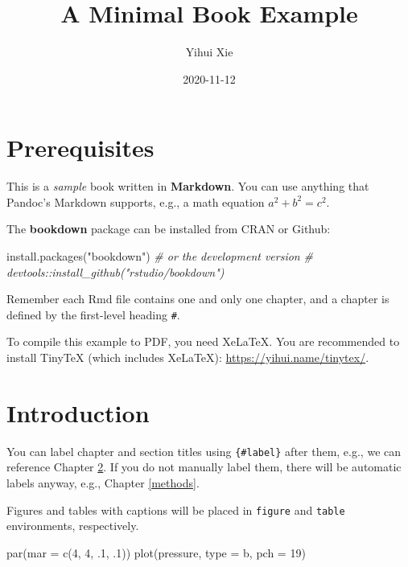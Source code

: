 \documentclass[
]{book}
\title{A Minimal Book Example}
\author{Yihui Xie}
\date{2020-11-12}
\newenvironment{Shaded}{\begin{snugshade}}{\end{snugshade}}
\newcommand{\AttributeTok}[1]{\textcolor[rgb]{0.77,0.63,0.00}{#1}}
\newcommand{\CommentTok}[1]{\textcolor[rgb]{0.56,0.35,0.01}{\textit{#1}}}
\newcommand{\DecValTok}[1]{\textcolor[rgb]{0.00,0.00,0.81}{#1}}
\newcommand{\FunctionTok}[1]{\textcolor[rgb]{0.00,0.00,0.00}{#1}}
\newcommand{\NormalTok}[1]{#1}
\newcommand{\StringTok}[1]{\textcolor[rgb]{0.31,0.60,0.02}{#1}}
\begin{document}
\maketitle

{
\setcounter{tocdepth}{1}
\tableofcontents
}
\hypertarget{prerequisites}{%
\chapter{Prerequisites}\label{prerequisites}}

This is a \emph{sample} book written in \textbf{Markdown}. You can use anything that Pandoc's Markdown supports, e.g., a math equation \(a^2 + b^2 = c^2\).

The \textbf{bookdown} package can be installed from CRAN or Github:

\begin{Shaded}
\begin{Highlighting}[]
\FunctionTok{install.packages}\NormalTok{(}\StringTok{"bookdown"}\NormalTok{)}
\CommentTok{\# or the development version}
\CommentTok{\# devtools::install\_github("rstudio/bookdown")}
\end{Highlighting}
\end{Shaded}

Remember each Rmd file contains one and only one chapter, and a chapter is defined by the first-level heading \texttt{\#}.

To compile this example to PDF, you need XeLaTeX. You are recommended to install TinyTeX (which includes XeLaTeX): \url{https://yihui.name/tinytex/}.

\hypertarget{intro}{%
\chapter{Introduction}\label{intro}}

You can label chapter and section titles using \texttt{\{\#label\}} after them, e.g., we can reference Chapter \ref{intro}. If you do not manually label them, there will be automatic labels anyway, e.g., Chapter \ref{methods}.

Figures and tables with captions will be placed in \texttt{figure} and \texttt{table} environments, respectively.

\begin{Shaded}
\begin{Highlighting}[]
\FunctionTok{par}\NormalTok{(}\AttributeTok{mar =} \FunctionTok{c}\NormalTok{(}\DecValTok{4}\NormalTok{, }\DecValTok{4}\NormalTok{, .}\DecValTok{1}\NormalTok{, .}\DecValTok{1}\NormalTok{))}
\FunctionTok{plot}\NormalTok{(pressure, }\AttributeTok{type =} \StringTok{\textquotesingle{}b\textquotesingle{}}\NormalTok{, }\AttributeTok{pch =} \DecValTok{19}\NormalTok{)}
\end{Highlighting}
\end{Shaded}
\end{document}
